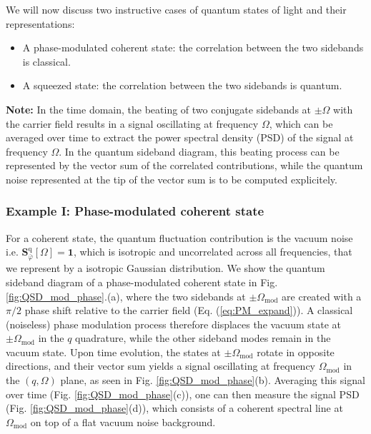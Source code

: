 We will now discuss two instructive cases of quantum states of light and their representations:
\begin{itemize}
  \item A phase-modulated coherent state: the correlation between the two sidebands is classical.
  \item A squeezed state: the correlation between the two sidebands is quantum. 
\end{itemize}


\noindent \textbf{Note:} In the time domain, the beating of two conjugate sidebands at $\pm \Omega$ with the carrier field results in a signal oscillating at frequency $\Omega$, which can be averaged over time to extract the power spectral density (PSD) of the signal at frequency $\Omega$. In the quantum sideband diagram, this beating process can be represented by the vector sum of the correlated contributions, while the quantum noise represented at the tip of the vector sum is to be computed explicitely.

\subsubsection{Example I: Phase-modulated coherent state}

For a coherent state, the quantum fluctuation contribution is the vacuum noise i.e. $\mathbf S_{\bar{\varphi}}^{\mathrm{q}}[\Omega] = \mathbf{1}$, which is isotropic and uncorrelated across all frequencies, that we represent by a isotropic Gaussian distribution. We show the quantum sideband diagram of a phase-modulated coherent state in Fig. \ref{fig:QSD_mod_phase}.(a), where the two sidebands at $\pm \Omega_{\mathrm{mod}}$ are created with a $\pi/2$ phase shift relative to the carrier field (Eq. (\ref{eq:PM_expand})). A classical (noiseless) phase modulation process therefore displaces the vacuum state at $\pm \Omega_{\mathrm{mod}}$ in the $q$ quadrature, while the other sideband modes remain in the vacuum state. Upon time evolution, the states at $\pm \Omega_{\mathrm{mod}}$ rotate in opposite directions, and their vector sum yields a signal oscillating at frequency $\Omega_{\mathrm{mod}}$ in the $(q,\Omega)$ plane, as seen in Fig. \ref{fig:QSD_mod_phase}(b). Averaging this signal over time (Fig. \ref{fig:QSD_mod_phase}(c)), one can then measure the signal PSD (Fig. \ref{fig:QSD_mod_phase}(d)), which consists of a coherent spectral line at $\Omega_{\mathrm{mod}}$ on top of a flat vacuum noise background. \\ 

